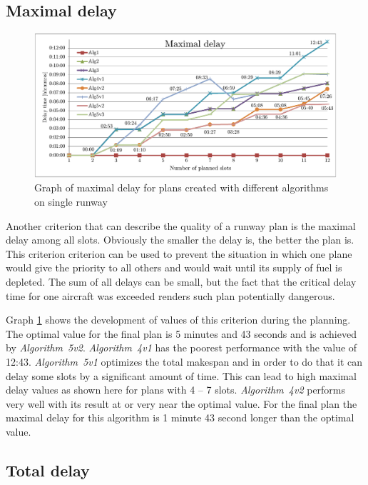 \subsection{Maximal delay}

\begin{figure}[h]
    \centering
    \includegraphics[width=\textwidth]{graphs/1rwy-alternating-maximal-delay.pdf}
    \caption{Graph of maximal delay for plans created with different algorithms on single runway}
    \label{graph:1rwy-alternating-maximal-delay}
\end{figure}

Another criterion that can describe the quality of a runway plan is the maximal delay among all slots. Obviously the smaller the delay is, the better the plan is. This criterion criterion can be used to prevent the situation in which one plane would give the priority to all others and would wait until its supply of fuel is depleted. The sum of all delays can be small, but the fact that the critical delay time for one aircraft was exceeded renders such plan potentially dangerous.

Graph \ref{graph:1rwy-alternating-maximal-delay} shows the development of values of this criterion during the planning. The optimal value for the final plan is 5 minutes and 43 seconds and is achieved by {\em Algorithm~5v2}. {\em Algorithm~4v1} has the poorest performance with the value of 12:43. {\em Algorithm~5v1} optimizes the total makespan and in order to do that it can delay some slots by a significant amount of time. This can lead to high maximal delay values as shown here for plans with 4 – 7 slots. {\em Algorithm~4v2} performs very well with its result at or very near the optimal value. For the final plan the maximal delay for this algorithm is 1 minute 43 second longer than the optimal value.

\subsection{Total delay}

